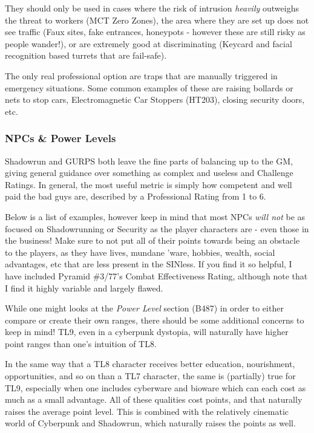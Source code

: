 \begin{multicols*}{2}
	They should only be used in cases where the risk of intrusion \textit{heavily} outweighs the threat to workers (MCT Zero Zones), the area where they are set up does not see traffic (Faux sites, fake entrances, honeypots - however these are still risky as people wander!), or are extremely good at discriminating (Keycard and facial recognition based turrets that are fail-safe).
	
	The only real professional option are traps that are manually triggered in emergency situations. Some common examples of these are raising bollards or nets to stop cars, Electromagnetic Car Stoppers (HT203), closing security doors, etc.
	
	\subsubsection{NPCs \& Power Levels}
	
	Shadowrun and GURPS both leave the fine parts of balancing up to the GM, giving general guidance over something as complex and useless and Challenge Ratings. In general, the most useful metric is simply how competent and well paid the bad guys are, described by a Professional Rating from 1 to 6. 
	
	Below is a list of examples, however keep in mind that most NPCs \textit{will not} be as focused on Shadowrunning or Security as the player characters are - even those in the business! Make sure to not put all of their points towards being an obstacle to the players, as they have lives, mundane 'ware, hobbies, wealth, social advantages, etc that are less present in the SINless. If you find it so helpful, I have included Pyramid \#3/77's Combat Effectiveness Rating, although note that I find it highly variable and largely flawed.
	
	While one might looks at the \textit{Power Level} section (B487) in order to either compare or create their own ranges, there should be some additional concerns to keep in mind! TL9, even in a cyberpunk dystopia, will naturally have higher point ranges than one's intuition of TL8. 
	
	In the same way that a TL8 character receives better education, nourishment, opportunities, and so on than a TL7 character, the same is (partially) true for TL9, especially when one includes cyberware and bioware which can each cost as much as a small advantage. All of these qualities cost points, and that naturally raises the average point level. This is combined with the relatively cinematic world of Cyberpunk and Shadowrun, which naturally raises the points as well.
	

\end{multicols*}

